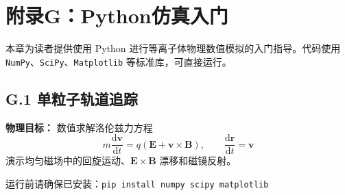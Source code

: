 \documentclass[12pt,a4paper,openany,oneside]{book}
\newcommand{\diff}{\mathrm{d}}
\newcommand{\vect}[1]{\bm{#1}}
\begin{document}
\chapter*{附录G：Python仿真入门}

本章为读者提供使用 Python 进行等离子体物理数值模拟的入门指导。代码使用 \texttt{NumPy}、\texttt{SciPy}、\texttt{Matplotlib} 等标准库，可直接运行。


\section{G.1 单粒子轨道追踪}

\textbf{物理目标：} 数值求解洛伦兹力方程
\begin{equation}
m\frac{\diff\vect{v}}{\diff t} = q(\vect{E}+\vect{v}\times\vect{B}), \qquad \frac{\diff\vect{r}}{\diff t} = \vect{v}
\label{eq:app-lorentz-force}
\end{equation}
演示均匀磁场中的回旋运动、$\vect{E}\times\vect{B}$ 漂移和磁镜反射。

\begin{tip}
运行前请确保已安装：\texttt{pip install numpy scipy matplotlib}
\end{tip}
\end{document}
